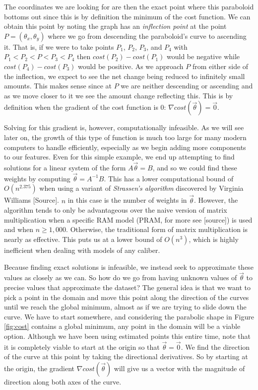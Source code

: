 The coordinates we are looking for are then the exact point where this
paraboloid bottoms out since this is by definition the minimum of the cost function. We can obtain
this point by noting the graph has an \emph{inflection point} at the point $P =
(\theta_x, \theta_y)$ where we go from descending the paraboloid's curve to
ascending it. That is, if we were to take points $P_1$, $P_2$, $P_3$, and $P_4$
with $P_1 < P_2 < P < P_3 < P_4$ then $cost(P_2) - cost(P_1)$ would be negative
while $cost(P_4) - cost(P_3)$ would be positive. As we approach $P$ from either
side of the inflection, we expect to see the net change being
reduced to infinitely small amounts. This makes sense since at
$P$ we are neither descending or ascending and as we move closer to it we see
the amount change reflecting this. This is by definition when the gradient of
the cost function is 0: $\nabla cost(\vec\theta) = \vec{0}$.

Solving for this gradient is, however, computationally infeasible. As we will
see later on, the growth of this type of function is much too large for many
modern computers to handle efficiently, especially as we begin adding more
components to our features. Even for this simple example, we end up attempting
to find solutions for a linear system of the form $A\vec\theta = B$, and so we could find these weights
by computing $\vec\theta =A^{-1}B$. This has a lower computational bound of
$O(n^{2.375})$ when using a variant of \emph{Strassen's algorithm} discovered by
Virginia Williams [Source]. $n$ in this case is the number of weights in
$\vec\theta$. However, the algorithm tends to only be advantageous over the naive
version of matrix multiplication when a specific RAM model (PRAM, for more see
[source]) is used and when $n \geq 1,000$. Otherwise, the traditional form of
matrix multiplication is nearly as effective. This puts us at a lower bound of
$O(n^3)$, which is highly inefficient when dealing with models of any caliber.

Because finding exact solutions is infeasible, we instead seek to approximate
these values as closely as we can. So how do we go from having unknown values of
$\vec\theta$ to precise values that approximate the dataset? The general idea is
that we want to pick a point in the domain and move this point along the direction of the curves until we reach the global minimum, almost as if we are trying to slide down the curve. We have to start
somewhere, and considering the parabolic shape in Figure \ref{fig:cost} contains a
global minimum, any point in the domain will be a viable option. Although we have been using estimated points this entire time, note that it is completely viable to start at the origin so that $\vec\theta = \vec0$. We find the direction of the curve at this point by taking the directional derivatives. So by starting at the origin, the gradient $\nabla cost(\vec\theta)$ will give us a vector with the magnitude of direction along both axes of the curve.


